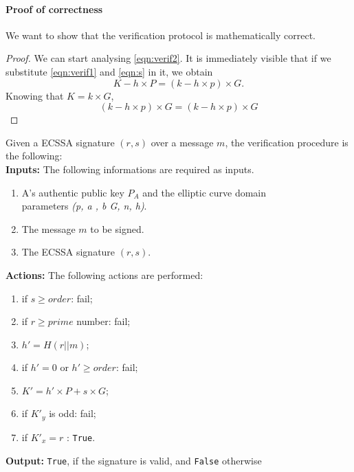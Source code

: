 \paragraph{Proof of correctness}
We want to show that the verification protocol is mathematically correct.
\begin{proof}
	We can start analysing \eqref{eqn:verif2}. It is immediately visible that if we substitute \eqref{eqn:verif1} and \eqref{eqn:s} in it, we obtain
	\begin{equation}
	K - h \times P = (k - h\times p)\times G.
	\end{equation}
	Knowing that $K=k \times G$, 
	\begin{equation}
	(k - h\times p)\times G = (k - h\times p)\times G 
	\end{equation}
	
\end{proof}

Given a ECSSA signature $(r,s)$ over a message $m$, the verification procedure is the following: \\
\textbf{Inputs:} The following informations are required as inputs. 

\hspace{1.1cm}
\begin{minipage}[l]{2\linewidth}
	\begin{enumerate}
		\item A's authentic public key  $P_{A}$ and the elliptic curve domain \\parameters \textit{(p, a , b G, n, h)}.
		\item The message $m$ to be signed.
		\item The ECSSA signature $(r,s)$.\\
	\end{enumerate}
\end{minipage}
\textbf{Actions:} The following actions are performed:

\hspace{1.1cm}
\begin{minipage}[l]{2\linewidth}
	\begin{enumerate}
		\item if $s\geq order$: fail;
		\item if $r \geq prime$ number: fail;
		\item $h'= H(r||m)$;
		\item if $h'=0$ or $h'\geq order$: fail;
		\item $K'=h' \times P+s \times G$;
		\item if $K'_{y}$ is odd: fail;
		\item if $K'_{x} = r$ : \texttt{True}.\\
	\end{enumerate}
\end{minipage}
\textbf{Output:} \texttt{True}, if the signature is valid, and \texttt{False} otherwise




